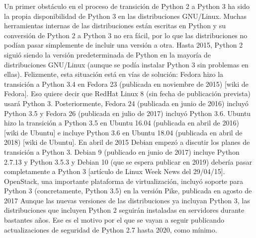 \documentclass[12pt]{article}
\begin{document}
Un primer obstáculo en el proceso de transición de Python 2 a Python 3 ha sido la propia disponibilidad de Python 3 en las distribuciones GNU/Linux. Muchas herramientas internas de las distribuciones están escritas en Python y su conversión de Python 2 a Python 3 no era fácil, por lo que las distribuciones no podían pasar simplemente de incluir una versión a otra.
Hasta 2015, Python 2 siguió siendo la versión predeterminada de Python en la mayoría de distribuciones GNU/Linux (aunque se podía instalar Python 3 sin problemas en ellas). Felizmente, esta situación está en vías de solución:
Fedora hizo la transición a Python 3.4 en Fedora 23 (publicada en noviembre de 2015) [wiki de Fedora]. Eso quiere decir que RedHat Linux 8 (sin fecha de publicación prevista) usará Python 3. Posteriormente, Fedora 24 (publicada en junio de 2016) incluyó Python 3.5 y Fedora 26 (publicada en julio de 2017) incluyó Python 3.6.
Ubuntu hizo la transición a Python 3.5 en Ubuntu 16.04 (publicada en abril de 2016) [wiki de Ubuntu] e incluye Python 3.6 en Ubuntu 18.04 (publicada en abril de 2018) [wiki de Ubuntu].
En abril de 2015 Debian empezó a discutir los planes de transición a Python 3. Debian 9 (publicado en junio de 2017) incluye Python 2.7.13 y Python 3.5.3 y Debian 10 (que se espera publicar en 2019) debería pasar completamente a Python 3 [artículo de Linux Week News del 29/04/15].
OpenStack, una importante plataforma de virtualización, incluyó soporte para Python 3 (concretamente, Python 3.5) en la versión Pike, publicada en agosto de 2017
Aunque las nuevas versiones de las distribuciones ya incluyan Python 3, las distribuciones que incluyen Python 2 seguirán instaladas en servidores durante bastantes años. Ese es el motivo por el que se vayan a seguir publicando actualizaciones de seguridad de Python 2.7 hasta 2020, como mínimo.
\end{document}
